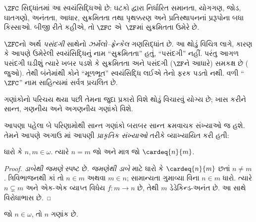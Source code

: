 \begin{defn}
$\ZFC$ સિદ્ધાંતમાં આ સ્વયંસિદ્ધિઓ છે: ઘટકો દ્વારા
નિર્ધારિત સમાનતા, યોગગણ, જોડ, ઘાતગણો, અનંતતા,
આધાર, સુક્રમિતતા તથા પૃથક્કરણ અને પ્રતિસ્થાપનનાં
પ્રરૂપોના બધા કિસ્સાઓ.
બીજી રીતે કહીએ, તો $\ZFC$ એ~$\ZF$માં સુક્રમિતતા
ઉમેરે છે.
\end{defn}

$\ZFC$નો અર્થ \emph{પસંદગી} સાથેનો
\emph{ઝર્મેલો--ફ્રેન્કેલ} ગણસિદ્ધાંત છે.
આ થોડું વિચિત્ર લાગે, કારણ કે આપણે ઉમેરેલી
સ્વયંસિદ્ધિનું નામ ``સુક્રમિતતા'' હતું, ``પસંદગી''
નહીં. પરંતુ આગળ {પસંદગી} ઘડીશું ત્યારે ખબર પડશે કે
સુક્રમિતતા અને પસંદગી ($\ZF$ને આધારે) સમકક્ષ છે
( જુઓ).
તેથી બંનેમાંથી કોને ``મૂળભૂત'' સ્વયંસિદ્ધિ લઈએ
તેનો ફરક પડતો નથી. વળી ``$\ZFC$'' નામ
સાહિત્યમાં સર્વત્ર પ્રચલિત છે.
\endgroup

\begingroup
\makeatletter{}\makeatother

\label{guunit:OLP-0584}


ગણાંકોનો પરિચય થયા પછી તેમના જુદા પ્રકારો વિશે થોડું
વિચારવું યોગ્ય છે; ખાસ કરીને સાન્ત, ગણનીય
અને અગણનીય ગણાંકો વિશે.

આપણા પહેલા બે પરિણામોથી સાન્ત ગણાંકો બરાબર સાન્ત
ક્રમવાચક સંખ્યાઓ જ હશે. તેમને આપણે અગાઉ
માં આપણી
\emph{પ્રાકૃતિક સંખ્યાઓ} તરીકે વ્યાખ્યાયિત કરી હતી:

\begin{prop}
ધારો કે $n, m \in \omega$. ત્યારે $n = m$ જો અને માત્ર જો
$\cardeq{n}{m}$.
\end{prop}

\begin{proof}
\emph{ડાબેથી જમણે} સ્પષ્ટ છે. \emph{જમણેથી ડાબે}
માટે ધારો કે $\cardeq{n}{m}$ છતાં $n \neq m$.
ત્રિવિભાજનથી કાં તો $n \in m$ અથવા $m \in n$;
સામાન્યતા ગુમાવ્યા વિના $n \in m$ ધારો.
ત્યારે $n \subsetneq m$ અને
એક-એક વ્યાપ્ત વિધેય $f \colon m \to n$ છે, તેથી $m$
ડેડેકિન્ડ-અનંત છે. આ
સાથે વિરોધાભાસ છે.
\end{proof}

\begin{cor}
જો $n \in \omega$, તો $n$ ગણાંક છે.
\end{cor}

